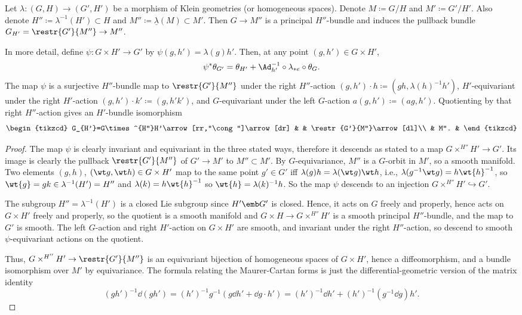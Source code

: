 \begin{lem}\label{lem 13.2 McKay}
    Let $\lambda:(G,H)\to (G',H')$ be a morphism of Klein geometries (or homogeneous spaces). Denote $M\coloneqq G\slash H$ and $M'\coloneqq G'\slash H'$. Also denote $H''\coloneqq \lambda^{-1}(H')\subset H$ and $M''\coloneqq \underline{\lambda}(M)\subset M'$. Then $G\to M''$ is a principal $H''$-bundle and induces the pullback bundle $G_{H'}=\restr{G'}{M''}\to M''$. 
    
    In more detail, define $\psi:G\times H'\to G'$ by $\psi(g,h')=\lambda(g)h'$. Then, at any point $(g,h')\in G\times H'$, 
    \[\psi^\ast\theta_{G'}=\theta_{H'}+\Ad_{h'}^{-1}\circ\lambda_{\ast e}\circ \theta_G.\] 
    The map $\psi$ is a surjective $H''$-bundle map to $\restr{G'}{M''}$ under the right $H''$-action $(g,h')\cdot h\coloneqq (gh,\lambda(h)^{-1}h')$, $H'$-equivariant under the right $H'$-action $(g,h')\cdot k'\coloneqq (g,h'k')$, and $G$-equivariant under the left $G$-action $a(g,h')\coloneqq (ag,h')$. Quotienting by that right $H''$-action gives an $H'$-bundle isomorphism 
    \[\begin{tikzcd}
        G_{H'}=G\times^{H''}H'\arrow[rr,"\cong"]\arrow[dr] & & \restr{G'}{M''}\arrow[dl]\\
        & M''. &
    \end{tikzcd}\]
\end{lem}
\begin{proof}
    The map $\psi$ is clearly invariant and equivariant in the three stated ways, therefore it descends as stated to a map $G\times^{H''} H'\to G'$. Its image is clearly the pullback $\restr{G'}{M''}$ of $G'\to M'$ to $M''\subset M'$. By $G$-equivariance, $M''$ is a $G$-orbit in $M'$, so a smooth manifold. Two elements $(g,h)$, $(\wt g,\wt h)\in G\times H'$ map to the same point $g'\in G'$ iff $\lambda(g)h=\lambda(\wt g)\wt h$, i.e., $\lambda(g^{-1}\wt g)=h\wt{h}^{-1}$, so $\wt{g}=gk\in \lambda^{-1}(H')=H''$ and $\lambda(k)=h\wt{h}^{-1}$ so $\wt{h}=\lambda(k)^{-1}h$. So the map $\psi$ descends to an injection $G\times^{H''}H'\hookrightarrow G'$. 

    The subgroup $H''=\lambda^{-1}(H')$ is a closed Lie subgroup since $H'\emb G'$ is closed. Hence, it acts on $G$ freely and properly, hence acts on $G\times H'$ freely and properly, so the quotient is a smooth manifold and $G\times H\to G\times^{H''}H'$ is a smooth principal $H''$-bundle, and the map to $G'$ is smooth. The left $G$-action and right $H'$-action on $G\times H'$ are smooth, and invariant under the right $H''$-action, so descend to smooth $\psi$-equivariant actions on the quotient.

    Thus, $G\times^{H''}H'\to \restr{G'}{M''}$ is an equivariant bijection of homogeneous spaces of $G\times H'$, hence a diffeomorphism, and a bundle isomorphism over $M'$ by equivariance. The formula relating the Maurer-Cartan forms is just the differential-geometric version of the matrix identity 
    \[(gh')^{-1}\dd (gh')=(h')^{-1}g^{-1}(g\dd h'+\dd g \cdot h')=(h')^{-1}\dd h'+(h')^{-1}(g^{-1}\dd g)h'.\]
\end{proof}


